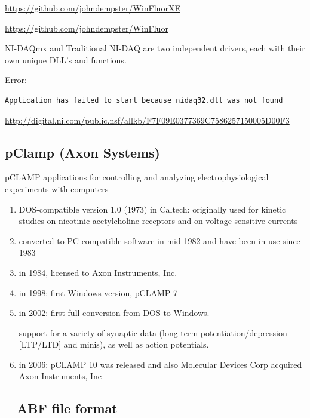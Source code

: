 \url{https://github.com/johndempster/WinFluorXE}

\url{https://github.com/johndempster/WinFluor}

NI-DAQmx and Traditional NI-DAQ are two independent drivers, each with their own
unique DLL's and functions.

Error:
\begin{verbatim}
Application has failed to start because nidaq32.dll was not found
\end{verbatim}
\url{http://digital.ni.com/public.nsf/allkb/F7F09E0377369C7586257150005D00F3}


 


\subsection{pClamp (Axon Systems)}
\label{sec:pCLAMP}

pCLAMP applications for controlling and analyzing electrophysiological
experiments with computers
\begin{enumerate}
  \item DOS-compatible version 1.0 (1973) in Caltech: originally used for
  kinetic studies on nicotinic acetylcholine receptors and on voltage-sensitive currents

  \item converted to PC-compatible software in mid-1982 and have been in use
  since 1983

  \item in 1984, licensed to Axon Instruments, Inc.

  \item in 1998: first Windows version, pCLAMP 7

  \item in 2002: first full conversion from DOS to Windows.

support for a variety of synaptic data (long-term potentiation/depression
[LTP/LTD] and minis), as well as action potentials.

  \item in 2006: pCLAMP 10 was released and also Molecular Devices Corp acquired
  Axon Instruments, Inc

\end{enumerate}

\subsection{-- ABF file format}
\label{sec:ABF-file-format}

